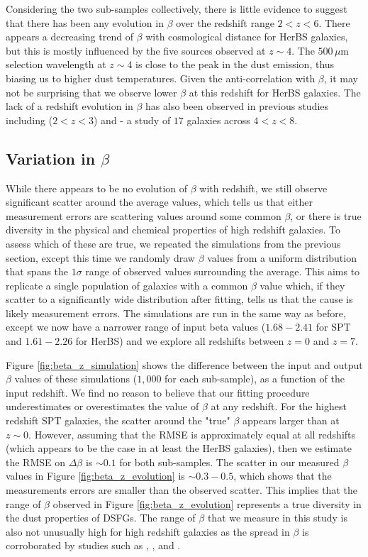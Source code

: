 Considering the two sub-samples collectively, there is little evidence to suggest that there has been any evolution in $\beta$ over the redshift range $2 < z < 6$. There appears a decreasing trend of $\beta$ with cosmological distance for HerBS galaxies, but this is mostly influenced by the five sources observed at $z \sim 4$. The $500\,\mu$m selection wavelength at $z \sim 4$ is close to the peak in the dust emission, thus biasing us to higher dust temperatures. Given the anti-correlation with $\beta$, it may not be surprising that we observe lower $\beta$ at this redshift for HerBS galaxies. The lack of a redshift evolution in $\beta$ has also been observed in previous studies including \citealt{Ismail_2023} ($2 < z < 3$) and \citealt{Witstok_2023} - a study of $17$ galaxies across $4 < z < 8$.

\subsection{Variation in $\beta$}

While there appears to be no evolution of $\beta$ with redshift, we still observe significant scatter around the average values, which tells us that either measurement errors are scattering values around some common $\beta$, or there is true diversity in the physical and chemical properties of high redshift galaxies. To assess which of these are true, we repeated the simulations from the previous section, except this time we randomly draw $\beta$ values from a uniform distribution that spans the $1\sigma$ range of observed values surrounding the average. This aims to replicate a single population of galaxies with a common $\beta$ value which, if they scatter to a significantly wide distribution after fitting, tells us that the cause is likely measurement errors. The simulations are run in the same way as before, except we now have a narrower range of input beta values ($1.68 - 2.41$ for SPT and $1.61 - 2.26$ for HerBS) and we explore all redshifts between $z = 0$ and $z = 7$.

Figure \ref{fig:beta_z_simulation} shows the difference between the input and output $\beta$ values of these simulations ($1,000$ for each sub-sample), as a function of the input redshift. We find no reason to believe that our fitting procedure underestimates or overestimates the value of $\beta$ at any redshift. For the highest redshift SPT galaxies, the scatter around the "true" $\beta$ appears larger than at $z \sim 0$. However, assuming that the RMSE is approximately equal at all redshifts (which appears to be the case in at least the HerBS galaxies), then we estimate the RMSE on $\Delta \beta$ is $\sim 0.1$ for both sub-samples. The scatter in our measured $\beta$ values in Figure \ref{fig:beta_z_evolution} is $\sim 0.3 - 0.5$, which shows that the measurements errors are smaller than the observed scatter. This implies that the range of $\beta$ observed in Figure \ref{fig:beta_z_evolution} represents a true diversity in the dust properties of DSFGs. The range of $\beta$ that we measure in this study is also not unusually high for high redshift galaxies as the spread in $\beta$ is corroborated by studies such as \citealt{daCunha_2021}, \citealt{Cooper_2022}, \citealt{Ismail_2023} and \citealt{Witstok_2023}.

